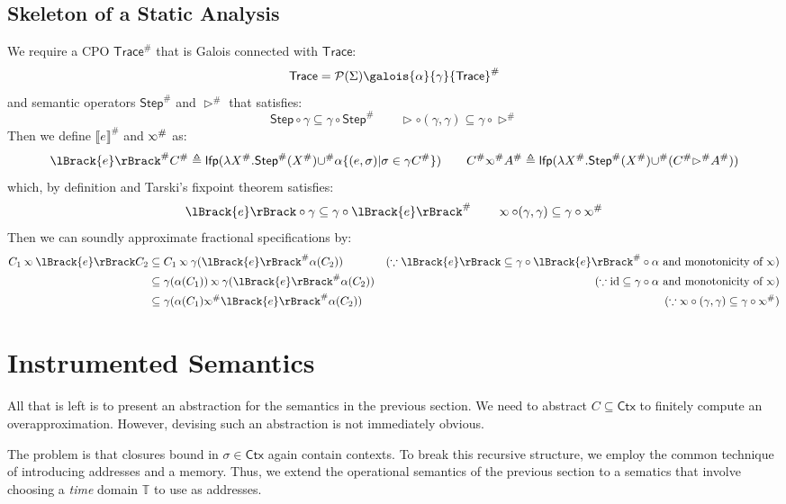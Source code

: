 \documentclass[acmsmall,screen,review]{acmart}\settopmatter{printfolios=true,printccs=false,printacmref=false}
\theoremstyle{acmdefinition}
\newcommand*{\pset}{\mathcal{P}}
\newcommand*{\Abs}[1]{{#1}^{\#}}
\newcommand*{\Time}{\mathbb{T}}
\newcommand*{\ctx}{\sigma}
\newcommand*{\Ctx}{\mathsf{Ctx}}
\newcommand*{\Trace}{\mathsf{Trace}}
\newcommand*{\lfp}{\mathsf{lfp}}
\newcommand*{\Step}{\mathsf{Step}}
\newcommand*{\semlink}{\mathbin{\rotatebox[origin=c]{180}{$\propto$}}}
\newcommand*{\sembracket}[1]{\lBrack{#1}\rBrack}
\begin{document}
\subsection{Skeleton of a Static Analysis}
We require a CPO $\Abs{\Trace}$ that is Galois connected with $\Trace$:
\[\Trace=\pset(\Sigma)\galois{\alpha}{\gamma}\Abs{\Trace}\]
and semantic operators $\Abs\Step$ and $\Abs\rhd$ that satisfies:
\[\Step\circ\gamma\subseteq\gamma\circ\Abs\Step\qquad\rhd\circ(\gamma,\gamma)\subseteq\gamma\circ\Abs\rhd\]
Then we define $\Abs{\sembracket{e}}$ and $\Abs\semlink$ as:
\[
  \Abs{\sembracket{e}}\Abs{C}\triangleq\lfp(\lambda\Abs{X}.\Abs\Step(\Abs{X})\Abs\cup\alpha\{(e,\ctx)|\ctx\in\gamma\Abs{C}\})\qquad
  \Abs{C}\Abs\semlink\Abs{A}\triangleq\lfp(\lambda\Abs{X}.\Abs\Step(\Abs{X})\Abs\cup(\Abs{C}\Abs\rhd\Abs{A}))
\]
which, by definition and Tarski's fixpoint theorem satisfies:
\[\sembracket{e}\circ\gamma\subseteq\gamma\circ\Abs{\sembracket{e}}\qquad\semlink\circ(\gamma,\gamma)\subseteq\gamma\circ\Abs\semlink\]
Then we can soundly approximate fractional specifications by:
\begin{align*}
  C_1\semlink\sembracket{e}C_2 & \subseteq C_1\semlink\gamma(\Abs{\sembracket{e}}\alpha(C_2))                 & (\because\sembracket{e}\subseteq\gamma\circ\Abs{\sembracket{e}}\circ\alpha\text{ and monotonicity of }\semlink) \\
                               & \subseteq \gamma(\alpha(C_1))\semlink\gamma(\Abs{\sembracket{e}}\alpha(C_2)) & (\because\text{id}\subseteq\gamma\circ\alpha\text{ and monotonicity of }\semlink)                               \\
                               & \subseteq\gamma(\alpha(C_1)\Abs\semlink\Abs{\sembracket{e}}\alpha(C_2))      & (\because\semlink\circ(\gamma,\gamma)\subseteq\gamma\circ\Abs\semlink)
\end{align*}
\section{Instrumented Semantics}
All that is left is to present an abstraction for the semantics in the previous section.
We need to abstract $C\subseteq\Ctx$ to finitely compute an overapproximation.
However, devising such an abstraction is not immediately obvious.

The problem is that closures bound in $\sigma\in\Ctx$ again contain contexts.
To break this recursive structure, we employ the common technique of introducing addresses and a memory.
Thus, we extend the operational semantics of the previous section to a sematics that involve choosing a \emph{time} domain $\Time$ to use as addresses.
\end{document}
